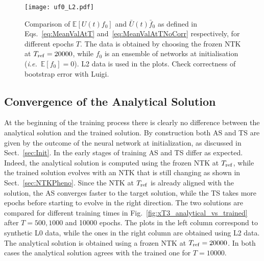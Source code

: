 \begin{figure}[t!]
  \centering
  \texttt{[image: uf0\_L2.pdf]}
  \caption{Comparison of $\mathbb{E}\left[U(t) f_{0}\right]$ and $\bar{U}(t)
    \bar{f}_{0}$ as defined in Eqs.~\eqref{eq:MeanValAtT}
    and~\eqref{eq:MeanValAtTNoCorr} respectively, for different epochs $T$. The
    data is obtained by choosing the frozen NTK at $T_{\rm ref} = 20000$, while
    $f_0$ is an ensemble of networks at initialisation (\textit{i.e.}\
    $\mathbb{E}[f_0]=0$). L2 data is used in the plots. \ac{Check correctness of
    bootstrap error with Luigi.}}
    \label{fig:xT3_exp_val}
  \end{figure}

\FloatBarrier

\subsection{Convergence of the Analytical Solution}
\label{sec:CheckAnalyticalConvergence}

At the beginning of the training process there is clearly no difference between
the analytical solution and the trained solution. By construction both AS and TS
are given by the outcome of the neural network at initialization, as discussed
in Sect.~\ref{sec:Init}. In the early stages of training AS and TS differ as
expected. Indeed, the analytical solution is computed using the frozen NTK at
$T_{\rm ref}$, while the trained solution evolves with an NTK that is still
changing as shown in Sect.~\ref{sec:NTKPheno}. Since the NTK at $T_{\rm ref}$ is
already aligned with the solution, the AS converges faster to the target
solution, while the TS takes more epochs before starting to evolve in the right
direction. The two solutions are compared for different training times in
Fig.~\ref{fig:xT3_analytical_vs_trained} after $T=500, 1000$ and 10000 epochs.
The plots in the left column correspond to synthetic L0 data, while the ones in
the right column are obtained using L2 data. The analytical solution is obtained
using a frozen NTK at $T_{\rm ref}=20000$. In both cases the analytical solution
agrees with the trained one for $T=10000$.

